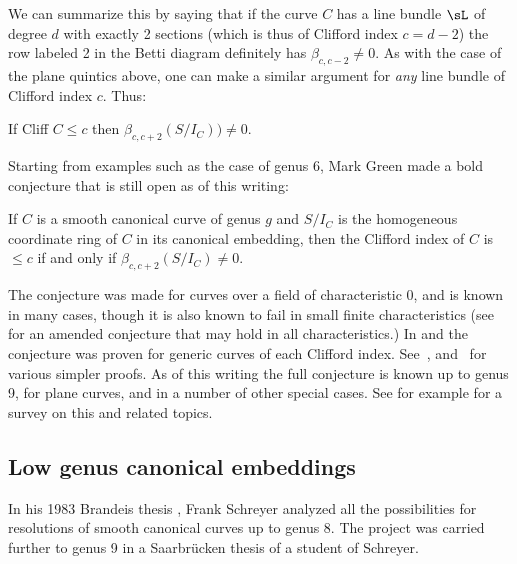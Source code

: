 We can summarize this by saying
that if the curve $C$ has a line bundle $\sL$ of degree $d$ with exactly 2 sections (which is thus of Clifford index $c = d-2$) the row labeled  2 
in the Betti diagram definitely has $\beta_{c, c-2} \neq 0$. As with the case of the plane quintics above, one can
make a similar argument for \emph{any} line bundle of Clifford index $c$. Thus:

\begin{corollary}
 If Cliff $C \leq c$ then $\beta_{c,c+2}(S/I_C)) \neq 0.$
\end{corollary}
 
Starting from examples such as the case of genus 6, Mark Green made a bold conjecture that is still open as of this writing:

\begin{conjecture}
If $C$ is a smooth canonical curve of genus $g$ and $S/I_C$ is the homogeneous coordinate ring of $C$ in its canonical embedding,
then the Clifford index of $C$ is $\leq c$ if and only if $\beta_{c,c+2}(S/I_C) \neq 0$. 
\end{conjecture}

The conjecture was made for curves over a field of characteristic 0, and is known in many cases, though it is also known to fail in small finite characteristics (see~\cite{Bopp-Schreyer} for an amended conjecture that may hold in all characteristics.)
In \cite{MR1941089} and \cite{MR2157134} the conjecture was proven for generic curves of each Clifford index.  See~\cite{MR4022070}, \cite{MR4213770} and~\cite{arXiv:2205.00266}  for various simpler proofs.  As of this writing the full conjecture is known up to genus 9,  for plane curves, and in a number of other special cases.
See for example \cite{Farkas-progress-on-syzygies} for a survey on this and related topics.

\subsection{Low genus canonical embeddings} 
In his 1983 Brandeis thesis \cite{Schreyer-canonical}, Frank Schreyer analyzed all the possibilities for resolutions of smooth canonical curves up to genus 8. The project was carried further to genus 9 in a Saarbr\"ucken thesis \cite{Sagraloff}  of a student of Schreyer.



%
%


